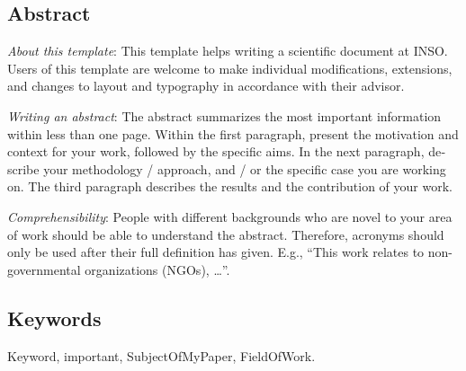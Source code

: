 \begin{otherlanguage}{english}
  
  \chapter*{Abstract}

  \emph{About this template}: 
  This template helps writing a scientific document at INSO. Users of this template are welcome to make individual modifications, extensions, and changes to layout and typography in accordance with their advisor.
  
  \emph{Writing an abstract}: 
  The abstract summarizes the most important information within less than one page. Within the first paragraph, present the motivation and context for your work, followed by the specific aims. In the next paragraph, describe your methodology / approach, and / or the specific case you are working on. The third paragraph describes the results and the contribution of your work. 
  
  \emph{Comprehensibility}: 
  People with different backgrounds who are novel to your area of work should be able to understand the abstract. Therefore, acronyms should only be used after their full definition has given. E.g., ``This work relates to non-governmental organizations (NGOs), \ldots''.

  \bigskip

  \section*{Keywords}
  Keyword, important, SubjectOfMyPaper, FieldOfWork. 

\end{otherlanguage}
